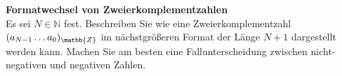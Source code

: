 \textbf{Formatwechsel von Zweierkomplementzahlen}\\
Es sei $N \in \mathbb{N}$ fest. Beschreiben Sie wie eine Zweierkomplementzahl $(a_{N-1}\dots a_0)_{\matbb{Z}}$ im nächstgrößeren Format der Länge $N+1$ dargestellt werden kann. Machen Sie am besten eine Fallunterscheidung zwischen nicht-negativen und negativen Zahlen.

